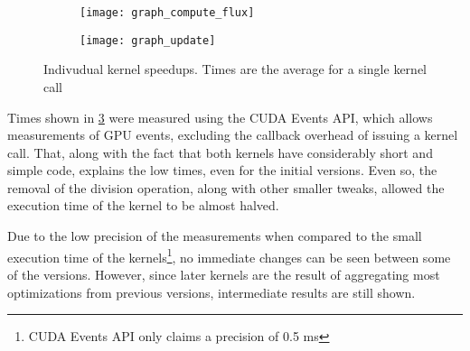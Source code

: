 \begin{figure}[!htp]
	\begin{subfigure}[b]{\columnwidth}
		\centering
		\texttt{[image: graph\_compute\_flux]}
		\caption{\computeflux}
		\label{fig:time_computeflux}
	\end{subfigure}
	\begin{subfigure}[b]{\columnwidth}
		\centering
		\texttt{[image: graph\_update]}
		\caption{\update}
		\label{fig:time_update}
	\end{subfigure}

	\caption{Indivudual kernel speedups. Times are the average for a single kernel call}
	\label{fig:time_kernels}
\end{figure}

Times shown in \cref{fig:time_kernels} were measured using the CUDA Events API, which allows measurements of GPU events, excluding the callback overhead of issuing a kernel call. That, along with the fact that both kernels have considerably short and simple code, explains the low times, even for the initial versions. Even so, the removal of the division operation, along with other smaller tweaks, allowed the execution time of the \update kernel to be almost halved.

Due to the low precision of the measurements when compared to the small execution time of the kernels\footnote{CUDA Events API only claims a precision of 0.5 ms}, no immediate changes can be seen between some of the versions. However, since later kernels are the result of aggregating most optimizations from previous versions, intermediate results are still shown.
